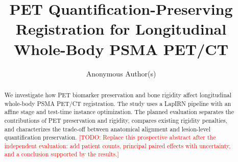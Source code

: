 \documentclass[runningheads]{llncs}
\newcommand{\todo}[1]{\textcolor{red}{[TODO: #1]}}
\newif\ifjournalblue
\newcommand{\journalcolor}{\ifjournalblue\color{blue}\fi}
\newenvironment{journaladdition}{\begingroup\journalcolor}{\endgroup}
\begin{document}
%
\title{PET Quantification-Preserving Registration for Longitudinal Whole-Body PSMA PET/CT}
%
%
\author{Anonymous Author(s)}
%
\maketitle              %
%
\begin{abstract}

\begin{journaladdition}
We investigate how PET biomarker preservation and bone rigidity affect longitudinal whole-body PSMA PET/CT registration.
The study uses a LapIRN pipeline with an affine stage and test-time instance optimization.
The planned evaluation separates the contributions of PET preservation and rigidity, compares existing rigidity penalties, and characterizes the trade-off between anatomical alignment and lesion-level quantification preservation.
\todo{Replace this prospective abstract after the independent evaluation: add patient counts, principal paired effects with uncertainty, and a conclusion supported by the results.}
\end{journaladdition}

\end{abstract}
%
%
%

\end{document}
